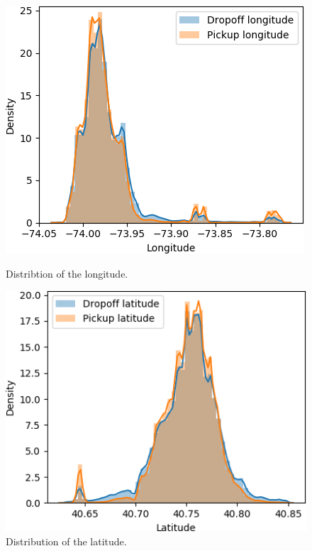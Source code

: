 \documentclass[a4paper]{article}
\begin{document}
\begin{figure}
    \centering
   \begin{minipage}{.45\textwidth}
        \includegraphics[width=\linewidth]{longitude}
        \caption{Distribtion of the longitude.}
        \label{long}
    \end{minipage}
    \hspace{0.05\textwidth}
    \begin{minipage}{.45\textwidth}
        \includegraphics[width=\linewidth]{latitude}
        \caption{Distribution of the latitude.}
        \label{lat}
    \end{minipage}
\end{figure}
\end{document}

